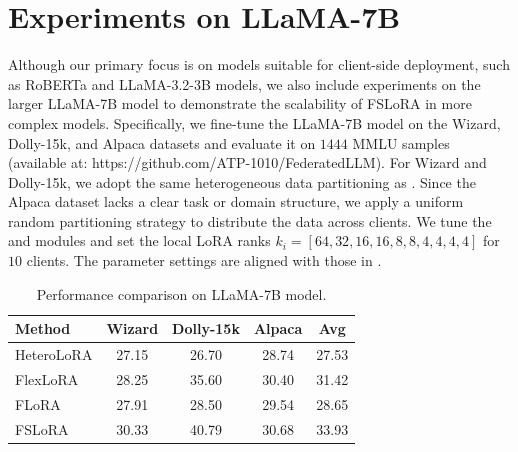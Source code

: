 \documentclass{article} %
\theoremstyle{plain}
\theoremstyle{definition}
\begin{document}



\section{Experiments on LLaMA-7B}\label{appen:larger_model}

Although our primary focus is on models suitable for client-side deployment, such as RoBERTa and LLaMA-3.2-3B models, we also include experiments on the larger LLaMA-7B model to demonstrate the scalability of FSLoRA in more complex models. Specifically, we fine-tune the LLaMA-7B model on the Wizard, Dolly-15k, and Alpaca datasets and evaluate it on $1444$ MMLU samples (available at: https://github.com/ATP-1010/FederatedLLM). For Wizard and Dolly-15k, we adopt the same heterogeneous data partitioning as \citep{wang2024flora}. Since the Alpaca dataset lacks a clear task or domain structure, we apply a uniform random partitioning strategy to distribute the data across clients. We tune the  and  modules and set the local LoRA ranks $k_i\!=\![64, 32, 16, 16, 8, 8, 4, 4, 4, 4]$ for $10$ clients. The parameter settings are aligned with those in \citep{wang2024flora}. 

\begin{table}[h]
\centering
\caption{Performance comparison on LLaMA-7B model.}
\begin{tabular}{lcccc}
\toprule
{Method} & {Wizard} & {Dolly-15k} & {Alpaca} & {Avg} \\
\midrule
HeteroLoRA         & 27.15           & 26.70              & 28.74           & 27.53        \\
FlexLoRA         & 28.25           & 35.60             & 30.40           & 31.42        \\
FLoRA    & 27.91           & 28.50              & 29.54           & 28.65        \\
\rowcolor{ours} FSLoRA & 30.33  & 40.79     & 30.68  & 33.93 \\
\bottomrule
\end{tabular}
\label{tab:llama7b_results}
\end{table}
\end{document}
